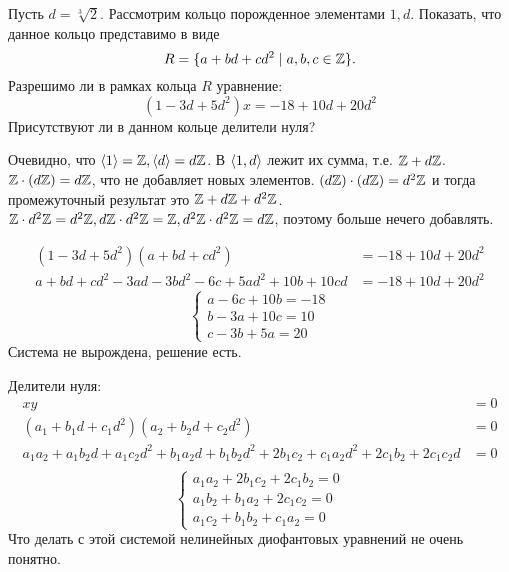 

\cfoot{}



\begin{exercise}
    Пусть \(d = \sqrt[3]{2}\). Рассмотрим кольцо порожденное элементами \(1, d\). Показать, что данное кольцо представимо в виде
    \[R = \{a + bd + cd^2 \mid a, b, c \in \mathbb{Z}\}.\]
    Разрешимо ли в рамках кольца \(R\) уравнение:
    \[(1 - 3d + 5d^2)x =- 18 + 10d + 20d^2\]
    Присутствуют ли в данном кольце делители нуля?
\end{exercise}
\begin{solution}
    Очевидно, что \(\ev{1} = \Z, \ev{d} = d\Z\). В \(\ev{1, d}\) лежит их сумма, т.е. \(\mathbb{Z} + d\mathbb{Z}\). \(\mathbb{Z} \cdot (d\mathbb{Z}) = d\mathbb{Z}\), что не добавляет новых элементов. \((d\mathbb{Z}) \cdot (d\mathbb{Z}) = d^2 \mathbb{Z}\) и тогда промежуточный результат это \(\mathbb{Z} + d\mathbb{Z} + d^2\mathbb{Z}\). \(\mathbb{Z} \cdot d^2\mathbb{Z} = d^2\mathbb{Z}, d\mathbb{Z} \cdot d^2\mathbb{Z} = \mathbb{Z}, d^2\mathbb{Z} \cdot d^2\mathbb{Z} = d\mathbb{Z}\), поэтому больше нечего добавлять.

    \begin{align*}
        (1 - 3d + 5d^2)(a + bd + cd^2)                        & = - 18 + 10d + 20d^2 \\
        a + bd + cd^2 - 3ad - 3bd^2 - 6c + 5ad^2 + 10b + 10cd & = - 18 + 10d + 20d^2
    \end{align*}
    \[\begin{cases}
            a - 6c + 10b = - 18 \\
            b - 3a + 10c = 10   \\
            c - 3b + 5a = 20
        \end{cases}\]
    Система не вырождена, решение есть.

    Делители нуля:
    \begin{align*}
        xy                                                                                            & = 0 \\
        (a_1 + b_1d + c_1d^2)(a_2 + b_2d + c_2d^2)                                                    & = 0 \\
        a_1a_2 + a_1b_2d + a_1c_2d^2 + b_1a_2d + b_1b_2d^2 + 2b_1c_2 + c_1a_2d^2 + 2c_1b_2 + 2c_1c_2d & = 0 \\
    \end{align*}
    \[\begin{cases}
            a_1a_2 + 2b_1c_2 + 2c_1b_2 = 0 \\
            a_1b_2 + b_1a_2 + 2c_1c_2 = 0  \\
            a_1c_2 + b_1b_2 + c_1a_2 = 0
        \end{cases}\]
    Что делать с этой системой нелинейных диофантовых уравнений не очень понятно.

\end{solution}

